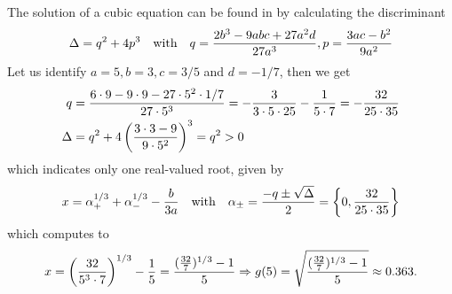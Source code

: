 \documentclass[12pt,onecolumn,journal,draftclsnofoot,letterpaper]{IEEEtran}
\newif\ifarxiv\arxivfalse
\begin{document}
%
The solution of a cubic equation can be found in \cite[2.3.2]{Zwi03} by calculating the discriminant
%
\begin{align}
  \Delta=q^2+4p^3 \quad\text{with}\quad q=\frac{2b^3-9abc+27a^2d}{27a^3},p=\frac{3ac-b^2}{9a^2}
\end{align}
%
Let us identify $a=5,b=3,c=3/5$ and $d=-1/7$, then we get
%
\begin{align}
  q&=\frac{6\cdot 9-9\cdot 9 - 27\cdot 5^2\cdot1/7}{27\cdot 5^3}
  =-\frac{3}{3\cdot 5\cdot 25} -\frac{1}{5\cdot 7}=-\frac{32}{25\cdot35}\\
  \Delta&=q^2 + 4 \left(\frac{3\cdot 3 -9}{9\cdot 5^2}\right)^3=q^2>0
\end{align}
%
which indicates only one real-valued root, given by
%
\begin{align}
  x=\alpha_+^{1/3}+\alpha_-^{1/3}-\frac{b}{3a} 
  \quad\text{with}\quad  \alpha_{\pm}=\frac{-q\pm\sqrt{\Delta}}{2} = \left\{0, \frac{32}{25\cdot 35} \right\}
\end{align}
%
which computes to
%
\begin{align}
  x=\left( \frac{32}{5^3\cdot 7}\right)^{1/3}- \frac{1}{5}
  =\frac{(\frac{32}{7})^{1/3}-1}{5} \Rightarrow g(5)=\sqrt{\frac{(\frac{32}{7})^{1/3}-1}{5}} \approx 0.363.
\end{align}
%
\fi %


\ifarxiv%
%
\end{document}
